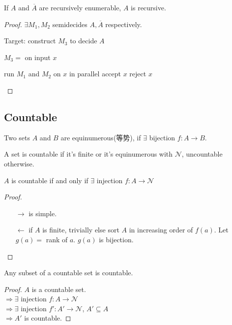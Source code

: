 \begin{theorem}\label{the:aaa}
    If $A$ and $\overline{A}$ are recursively enumerable, $A$ is recursive. 
\end{theorem}
\begin{proof}
    $\exists M_1, M_2$ semidecides $A, \overline{A}$ respectively.

    Target: construct $M_3$ to decide $A$

    $M_3=$ on input $x$
    \begin{algorithm}[H]
        \caption{$M_3$}
        \begin{algorithmic}
            \State run $M_1$ and $M_2$ on $x$ in parallel
                \State accept $x$
                \State reject $x$
            \EndIf
        \end{algorithmic}
    \end{algorithm}
\end{proof}

\subsection{Countable}

\begin{definition}
    Two sets $A$ and $B$ are equinumerous(等势), if $\exists$ bijection $f:A\to B$. 

    A set is countable if it's finite or it's equinumerous with $\mathcal{N}$, uncountable otherwise. 
\end{definition}

\begin{lemma}
    $A$ is countable if and only if $\exists$ injection $f:A\to \mathcal{N}$
\end{lemma}
\begin{proof}\quad

    \begin{enumerate}
        \item [$\to$] is simple. 
        \item [$\leftarrow$] if $A$ is finite, trivially
        \subitem else sort $A$ in increasing order of $f(a)$. Let $g(a)=$ rank of $a$. $g(a)$ is bijection. 
    \end{enumerate}
\end{proof}

\begin{corollary}
    Any subset of a countable set is countable. 
\end{corollary}
\begin{proof}
    $A$ is a countable set. \\
    $\Rightarrow \exists$ injection $f:A\to \mathcal{N}$\\
    $\Rightarrow \exists$ injection $f':A' \to \mathcal{N}$, $A'\subseteq A$\\
    $\Rightarrow A'$ is countable. 
\end{proof}

